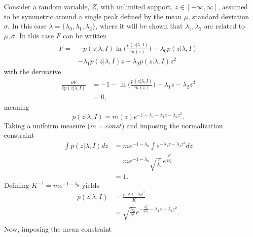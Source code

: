 \begin{example}
	Consider a random variable, $Z$, with unlimited support, $z\in [-\infty,\infty]$, assumed to be symmetric around a single peak defined by the mean $\mu$, standard deviation $\sigma$. In this case $\lambda = \{\lambda_0,\lambda_1,\lambda_2\}$, where it will be shown that $\lambda_1,\lambda_2$ are related to $\mu,\sigma$. In this case $F$ can be written\label{ex:gauss}
	\begin{equation}
		\begin{split}
			F =& -p(z|\lambda,I)\ln\bigg(\frac{p(z|\lambda,I)}{m(z)}\bigg)-\lambda_0p(z|\lambda,I)\\
			&-\lambda_1p(z|\lambda,I)z-\lambda_2p(z|\lambda,I)z^2
		\end{split}
	\end{equation}
	with the derivative
	\begin{equation}
		\begin{split}
			\frac{\partial F}{\partial p(z|\lambda,I)} &= -1-\ln\bigg(\frac{p(z|\lambda,I)}{m(z)}\bigg)-\lambda_1z-\lambda_2z^2\\
			&=0,
		\end{split}
	\end{equation}
	meaning
	\begin{equation}
		p(z|\lambda,I)=m(z)e^{-1-\lambda_0-\lambda_1z-\lambda_2z^2}.
	\end{equation}
	Taking a unifoirm measure ($m= const$) and imposing the normalization constraint
	\begin{equation}
		\begin{split}
			\int p(z|\lambda,I) dz &= me^{-1-\lambda_0}\int e^{-\lambda_1z-\lambda_2z^2}dz\\
			&= me^{-1-\lambda_0}\sqrt{\frac{\pi}{\lambda_2}}e^{\frac{\lambda_1^2}{4\lambda_2}}\\
			&=1.
		\end{split}
	\end{equation}
	Defining $K^{-1} = me^{-1-\lambda_0}$ yields
	\begin{equation}
		\begin{split}
			p(z|\lambda,I) &= \frac{e^{-\lambda_1x-\lambda_2x^2}}{K}\\
			&= \sqrt{\frac{\lambda_2}{\pi}}e^{-\frac{\lambda_1^2}{4\lambda_2}-\lambda_1z-\lambda_2z^2}.\\
		\end{split}
	\end{equation}
	Now, imposing the mean constraint

\end{example}
